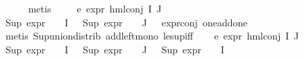 \begin{isabellebody}
\ \ \ \ \isamarkupfalse%
\ {\isacharparenleft}{\kern0pt}metis\ {\isacharparenright}{\kern0pt}{\isacharplus}{\kern0pt}\isanewline
\ \ \isamarkupfalse%
\ e{}{\isacharcolon}{\kern0pt}\ {\isachardoublequoteopen}expr{\isacharunderscore}{\kern0pt}{}\ {\isacharparenleft}{\kern0pt}hml{\isacharunderscore}{\kern0pt}conj\ I\ J\ {\isasymPhi}{\isacharparenright}{\kern0pt}\ {\isasymle}\ {}{\isachardoublequoteclose}\isanewline
\ \ \ \ \isamarkupfalse%
\ {\isacartoucheopen}Sup\ {\isacharparenleft}{\kern0pt}{\isacharparenleft}{\kern0pt}expr{\isacharunderscore}{\kern0pt}{}\ {\isasymcirc}\ {\isasymPhi}{\isacharparenright}{\kern0pt}\ {\isacharbackquote}{\kern0pt}\ I{\isacharparenright}{\kern0pt}\ {\isasymle}\ {}{\isacartoucheclose}\ {\isacartoucheopen}Sup\ {\isacharparenleft}{\kern0pt}{\isacharparenleft}{\kern0pt}expr{\isacharunderscore}{\kern0pt}{}\ {\isasymcirc}\ {\isasymPhi}{\isacharparenright}{\kern0pt}\ {\isacharbackquote}{\kern0pt}\ J{\isacharparenright}{\kern0pt}\ {\isasymle}\ {}{\isacartoucheclose}\ expr{\isacharunderscore}{\kern0pt}{}{\isacharunderscore}{\kern0pt}conj\ one{\isacharunderscore}{\kern0pt}add{\isacharunderscore}{\kern0pt}one\isanewline
\ \ \ \ \isamarkupfalse%
\ {\isacharparenleft}{\kern0pt}metis\ Sup{\isacharunderscore}{\kern0pt}union{\isacharunderscore}{\kern0pt}distrib\ add{\isacharunderscore}{\kern0pt}left{\isacharunderscore}{\kern0pt}mono\ le{\isacharunderscore}{\kern0pt}sup{\isacharunderscore}{\kern0pt}iff{\isacharparenright}{\kern0pt}\isanewline
\ \ \isamarkupfalse%
\ e{}{\isacharcolon}{\kern0pt}\ {\isachardoublequoteopen}expr{\isacharunderscore}{\kern0pt}{}\ {\isacharparenleft}{\kern0pt}hml{\isacharunderscore}{\kern0pt}conj\ I\ J\ {\isasymPhi}{\isacharparenright}{\kern0pt}\ {\isasymle}\ {}{\isachardoublequoteclose}\isanewline
\ \ \ \ \isamarkupfalse%
\ {\isacartoucheopen}Sup\ {\isacharparenleft}{\kern0pt}{\isacharparenleft}{\kern0pt}expr{\isacharunderscore}{\kern0pt}{}\ {\isasymcirc}\ {\isasymPhi}{\isacharparenright}{\kern0pt}\ {\isacharbackquote}{\kern0pt}\ I{\isacharparenright}{\kern0pt}\ {\isasymle}\ {}{\isacartoucheclose}\ {\isacartoucheopen}Sup\ {\isacharparenleft}{\kern0pt}{\isacharparenleft}{\kern0pt}expr{\isacharunderscore}{\kern0pt}{}\ {\isasymcirc}\ {\isasymPhi}{\isacharparenright}{\kern0pt}\ {\isacharbackquote}{\kern0pt}\ J{\isacharparenright}{\kern0pt}\ {\isasymle}\ {}{\isacartoucheclose}\ {\isacartoucheopen}Sup\ {\isacharparenleft}{\kern0pt}{\isacharparenleft}{\kern0pt}expr{\isacharunderscore}{\kern0pt}{}\ {\isasymcirc}\ {\isasymPhi}{\isacharparenright}{\kern0pt}\ {\isacharbackquote}{\kern0pt}\ I{\isacharparenright}{\kern0pt}\ {\isasymle}\ {}{\isacartoucheclose}\ \isanewline

\end{isabellebody}
